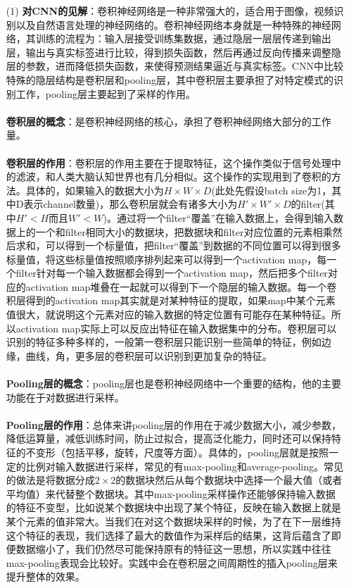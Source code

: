 \documentclass[a4paper,UTF8]{article}
\numberwithin{equation}{section}
\begin{document}
\begin{enumerate}
\item [(1)]
\textbf{对CNN的见解}：卷积神经网络是一种非常强大的，适合用于图像，视频识别以及自然语言处理的神经网络的。卷积神经网络本身就是一种特殊的神经网络，其训练的流程为：输入层接受训练集数据，通过隐层一层层传递到输出层，输出与真实标签进行比较，得到损失函数，然后再通过反向传播来调整隐层的参数，进而降低损失函数，来使得预测结果逼近与真实标签。CNN中比较特殊的隐层结构是卷积层和pooling层，其中卷积层主要承担了对特定模式的识别工作，pooling层主要起到了采样的作用。\\\\
\textbf{卷积层的概念}：是卷积神经网络的核心，承担了卷积神经网络大部分的工作量。\\\\
\textbf{卷积层的作用}：卷积层的作用主要在于提取特征，这个操作类似于信号处理中的滤波，和人类大脑认知世界也有几分相似。这个操作的实现用到了卷积的方法。具体的，如果输入的数据大小为$H\times W\times D$(此处先假设batch size为1，其中D表示channel数量)，那么卷积层就会有诸多大小为$H'\times W'\times D$的filter(其中$H' < H$而且$W' < W$)。通过将一个filter“覆盖”在输入数据上，会得到输入数据上的一个和filter相同大小的数据块，把数据块和filter对应位置的元素相乘然后求和，可以得到一个标量值，把filter“覆盖”到数据的不同位置可以得到很多标量值，将这些标量值按照顺序排列起来可以得到一个activation map，每一个filter针对每一个输入数据都会得到一个activation map，然后把多个filter对应的activation map堆叠在一起就可以得到下一个隐层的输入数据。每一个卷积层得到的activation map其实就是对某种特征的提取，如果map中某个元素值很大，就说明这个元素对应的输入数据的特定位置有可能存在某种特征。所以activation map实际上可以反应出特征在输入数据集中的分布。卷积层可以识别的特征多种多样的，一般第一卷积层只能识别一些简单的特征，例如边缘，曲线，角，更多层的卷积层可以识别到更加复杂的特征。\\\\
\textbf{Pooling层的概念}：pooling层也是卷积神经网络中一个重要的结构，他的主要功能在于对数据进行采样。\\\\
\textbf{Pooling层的作用}：总体来讲pooling层的作用在于减少数据大小，减少参数，降低运算量，减低训练时间，防止过拟合，提高泛化能力，同时还可以保持特征的不变形（包括平移，旋转，尺度等方面）。具体的，pooling层就是按照一定的比例对输入数据进行采样，常见的有max-pooling和average-pooling。常见的做法是将数据分成$2\times 2$的数据块然后从每个数据块中选择一个最大值（或者平均值）来代替整个数据块。其中max-pooling采样操作还能够保持输入数据的特征不变型，比如说某个数据块中出现了某个特征，反映在输入数据上就是某个元素的值非常大。当我们在对这个数据块采样的时候，为了在下一层维持这个特征的表现，我们选择了最大的数值作为采样后的结果，这背后蕴含了即便数据缩小了，我们仍然尽可能保持原有的特征这一思想，所以实践中往往max-pooling表现会比较好。实践中会在卷积层之间周期性的插入pooling层来提升整体的效果。\\

\end{enumerate}
\end{document}
